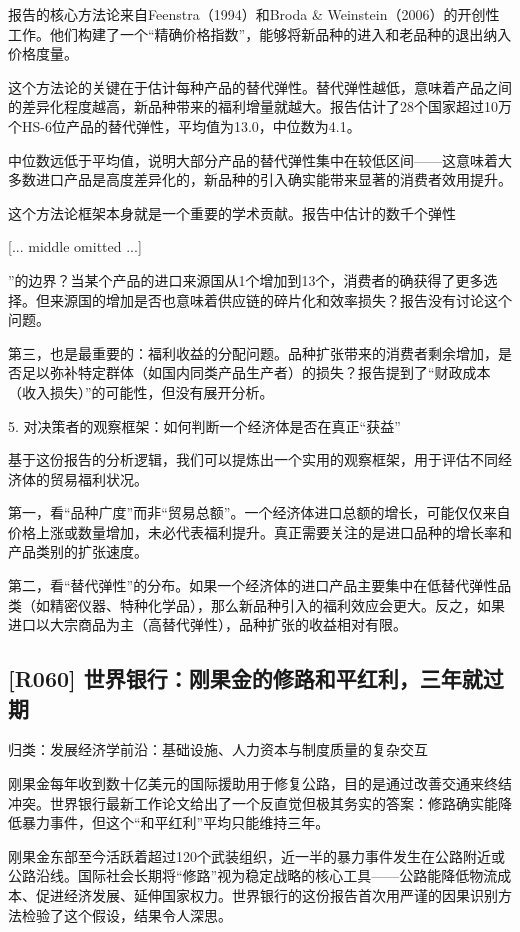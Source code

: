 \documentclass[11pt]{ctexart}
\begin{document}
报告的核心方法论来自Feenstra（1994）和Broda \& Weinstein（2006）的开创性工作。他们构建了一个“精确价格指数”，能够将新品种的进入和老品种的退出纳入价格度量。

这个方法论的关键在于估计每种产品的替代弹性。替代弹性越低，意味着产品之间的差异化程度越高，新品种带来的福利增量就越大。报告估计了28个国家超过10万个HS-6位产品的替代弹性，平均值为13.0，中位数为4.1。

中位数远低于平均值，说明大部分产品的替代弹性集中在较低区间——这意味着大多数进口产品是高度差异化的，新品种的引入确实能带来显著的消费者效用提升。

这个方法论框架本身就是一个重要的学术贡献。报告中估计的数千个弹性

[... middle omitted ...]

”的边界？当某个产品的进口来源国从1个增加到13个，消费者的确获得了更多选择。但来源国的增加是否也意味着供应链的碎片化和效率损失？报告没有讨论这个问题。

第三，也是最重要的：福利收益的分配问题。品种扩张带来的消费者剩余增加，是否足以弥补特定群体（如国内同类产品生产者）的损失？报告提到了“财政成本（收入损失）”的可能性，但没有展开分析。

5. 对决策者的观察框架：如何判断一个经济体是否在真正“获益”

基于这份报告的分析逻辑，我们可以提炼出一个实用的观察框架，用于评估不同经济体的贸易福利状况。

第一，看“品种广度”而非“贸易总额”。一个经济体进口总额的增长，可能仅仅来自价格上涨或数量增加，未必代表福利提升。真正需要关注的是进口品种的增长率和产品类别的扩张速度。

第二，看“替代弹性”的分布。如果一个经济体的进口产品主要集中在低替代弹性品类（如精密仪器、特种化学品），那么新品种引入的福利效应会更大。反之，如果进口以大宗商品为主（高替代弹性），品种扩张的收益相对有限。

\subsection{[R060] 世界银行：刚果金的修路和平红利，三年就过期}
{\small\color{refgray}归类：发展经济学前沿：基础设施、人力资本与制度质量的复杂交互}

刚果金每年收到数十亿美元的国际援助用于修复公路，目的是通过改善交通来终结冲突。世界银行最新工作论文给出了一个反直觉但极其务实的答案：修路确实能降低暴力事件，但这个“和平红利”平均只能维持三年。

刚果金东部至今活跃着超过120个武装组织，近一半的暴力事件发生在公路附近或公路沿线。国际社会长期将“修路”视为稳定战略的核心工具——公路能降低物流成本、促进经济发展、延伸国家权力。世界银行的这份报告首次用严谨的因果识别方法检验了这个假设，结果令人深思。
\end{document}

